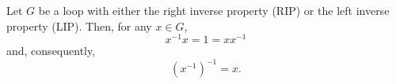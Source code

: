Let $G$ be a loop with either the right inverse property (RIP) or the left inverse property (LIP). Then, for any $x \in G$,
$$x^{-1}x = 1 = xx^{-1}$$
and, consequently,
$$(x^{-1})^{-1} = x.$$
